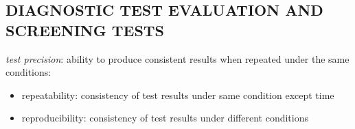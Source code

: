 \documentclass[
]{article}
\begin{document}
\hypertarget{diagnostic-test-evaluation-and-screening-tests}{%
\subsection{DIAGNOSTIC TEST EVALUATION AND SCREENING
TESTS}\label{diagnostic-test-evaluation-and-screening-tests}}

\emph{test precision}: ability to produce consistent results when
repeated under the same conditions:

\begin{itemize}
\item
  repeatability: consistency of test results under same condition except
  time
\item
  reproducibility: consistency of test results under different
  conditions
\end{itemize}
\end{document}
